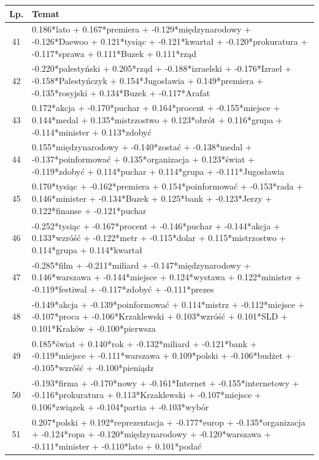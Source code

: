 \documentclass[11pt,a4paper]{article}
\begin{document}
\begin{table}[h]
\begin{tabular}{|c|>{\footnotesize}p{\linewidth}|}
\hline
Lp. & Temat \\\hline

41 & 0.186*lato + 0.167*premiera + -0.129*międzynarodowy + -0.126*Daewoo + 0.121*tysiąc + -0.121*kwartał + -0.120*prokuratura + -0.117*sprawa + 0.111*Buzek + 0.111*rząd\\\hline
42 & -0.220*palestyński + 0.205*rząd + -0.188*izraelski + -0.176*Izrael + -0.158*Palestyńczyk + 0.154*Jugosławia + 0.149*premiera + -0.135*rosyjski + 0.134*Buzek + -0.117*Arafat\\\hline
43 & 0.172*akcja + -0.170*puchar + 0.164*procent + -0.155*miejsce + 0.144*medal + 0.135*mistrzostwo + 0.123*obrót + 0.116*grupa + -0.114*minister + 0.113*zdobyć\\\hline
44 & 0.155*międzynarodowy + -0.140*zostać + -0.138*medal + -0.137*poinformować + 0.135*organizacja + 0.123*świat + -0.119*zdobyć + 0.114*puchar + 0.114*grupa + -0.111*Jugosławia\\\hline
45 & 0.170*tysiąc + -0.162*premiera + 0.154*poinformować + -0.153*rada + 0.146*minister + -0.134*Buzek + 0.125*bank + -0.123*Jerzy + 0.122*finanse + -0.121*puchar\\\hline
46 & -0.252*tysiąc + -0.167*procent + -0.146*puchar + -0.144*akcja + 0.133*wzróść + -0.122*metr + -0.115*dolar + 0.115*mistrzostwo + 0.114*grupa + 0.114*kwartał\\\hline
47 & -0.285*film + -0.211*miliard + -0.147*międzynarodowy + 0.146*warszawa + -0.144*miejsce + 0.124*wystawa + 0.122*minister + -0.119*festiwal + -0.117*zdobyć + -0.111*prezes\\\hline
48 & -0.149*akcja + -0.139*poinformować + 0.114*mistrz + -0.112*miejsce + -0.107*proca + -0.106*Krzaklewski + 0.103*wzróść + 0.101*SLD + 0.101*Kraków + -0.100*pierwsza\\\hline
49 & 0.185*świat + 0.140*rok + -0.132*miliard + -0.121*bank + -0.119*miejsce + -0.111*warszawa + 0.109*polski + -0.106*budżet + -0.105*wzróść + -0.100*pieniądz\\\hline
50 & -0.193*firma + -0.170*nowy + -0.161*Internet + -0.155*internetowy + -0.116*prokuratura + 0.113*Krzaklewski + -0.107*miejsce + 0.106*związek + -0.104*partia + -0.103*wybór\\\hline
51 & 0.207*polski + 0.192*reprezentacja + -0.177*europ + -0.135*organizacja + -0.124*ropa + -0.120*międzynarodowy + -0.120*warszawa + -0.111*minister + -0.110*lato + 0.101*podać\\\hline

\end{tabular}
\end{table}
\end{document}
